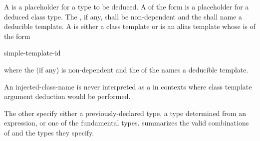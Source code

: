 \pnum
{}%
%
%
%
%
%
%
%
%
%
%
%
%
%
%
%
A 
is a placeholder for
a type to be deduced.
%
A  of the form
  
is a placeholder for
a deduced class type.
The , if any, shall be non-dependent and
the  shall name a deducible template.
A  is either a class template or
is an alias template whose  is of the form
\begin{ncsimplebnf}
   simple-template-id
\end{ncsimplebnf}
where the  (if any) is non-dependent and
the  of the 
names a deducible template.
\begin{note}
An injected-class-name is never interpreted as a 
in contexts where class template argument deduction would be performed.
\end{note}
The other
specify either a previously-declared type, a type determined from an
expression, or one of the
fundamental types.
 summarizes the valid combinations of
and the types they specify.

